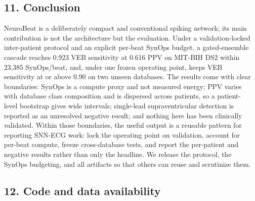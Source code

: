 \documentclass[
]{article}
\begin{document}
\subsection{11. Conclusion}\label{conclusion}

NeuroBeat is a deliberately compact and conventional spiking network;
its main contribution is not the architecture but the evaluation. Under
a validation-locked inter-patient protocol and an explicit per-beat
SynOps budget, a gated-ensemble cascade reaches 0.923 VEB sensitivity at
0.616 PPV on MIT-BIH DS2 within 23,385 SynOps/beat, and, under one
frozen operating point, keeps VEB sensitivity at or above 0.90 on two
unseen databases. The results come with clear boundaries: SynOps is a
compute proxy and not measured energy; PPV varies with database class
composition and is dispersed across patients, so a patient-level
bootstrap gives wide intervals; single-lead supraventricular detection
is reported as an unresolved negative result; and nothing here has been
clinically validated. Within those boundaries, the useful output is a
reusable pattern for reporting SNN-ECG work: lock the operating point on
validation, account for per-beat compute, freeze cross-database tests,
and report the per-patient and negative results rather than only the
headline. We release the protocol, the SynOps budgeting, and all
artifacts so that others can reuse and scrutinize them.

\subsection{12. Code and data
availability}\label{code-and-data-availability}
\end{document}
